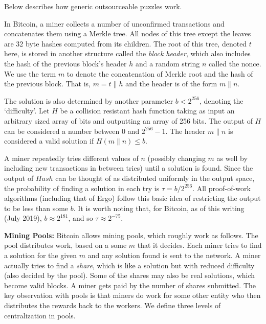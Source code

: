 \documentclass[11pt]{article}
\newcommand{\authnote}[2]{\marginpar{\parbox{\marginparwidth}{\tiny %
  \textsf{#1 {\textcolor{blue}{notes: #2}}}}}%
  \textcolor{blue}{\textbf{\dag}}}
\newcommand{\authnote}[2]{
  \textsf{#1 \textcolor{blue}{: #2}}}
\newcommand{\authnote}[2]{}
\newcommand{\snote}[1]{{\authnote{\textcolor{yellow}{Scalahub notes}}{#1}}}
\begin{document}
Below describes how generic outsourceable puzzles work. 

\snote{Following is more or less copy-pasted from PoW intro paper. Needs rework}


In Bitcoin, a miner collects a number of unconfirmed transactions and concatenates them using a Merkle tree. All nodes of this tree except the leaves are 32 byte hashes computed from its children. The root of this tree, denoted $t$ here, is stored in another structure called the {\em block header}, which also includes the hash of the previous block's header $h$ and a random string $n$ called the nonce. We use the term $m$ to denote the concatenation of Merkle root and the hash of the previous block. 
That is, $m = t\|h$ and the header is of the form $m\|n$. 

The solution is also determined by another parameter $b < 2^{256}$, denoting the `difficulty'. Let $H$ be a collision resistant hash function taking as input an arbitrary sized array of bits and outputting an array of 256 bits. The output of $H$ can be considered a number between 0 and $2^{256}-1$. The header $m\|n$ is considered a valid solution if $H(m\|n) \leq b$. 

A miner repeatedly tries different values of $n$ (possibly changing $m$ as well by including new transactions in between tries) until a solution is found. Since the output of $Hash$ can be thought of as distributed uniformly in the output space, the probability of finding a solution in each try is $\tau = b/2^{256}$. All proof-of-work algorithms (including that of Ergo) follow this basic idea of restricting the output to be less than some $b$. It is worth noting that, for Bitcoin, as of this writing (July 2019), $b\approx 2^{181}$, and so $\tau \approx 2^{-75}$. %

\textbf{Mining Pools:} Bitcoin allows mining pools, which roughly work as follows. The pool distributes work, based on a some $m$ that it decides. Each miner tries to find a solution for the given $m$ and any solution found is sent to the network. 
A miner actually tries to find a {\em share}, which is like a solution but with reduced difficulty (also decided by the pool). Some of the shares may also be real solutions, which become valid blocks. A miner gets paid by the number of shares submitted.
The key observation with pools is that miners do work for some other entity who then distributes the rewards back to the workers.
We define three levels of centralization in pools. 
\end{document}
